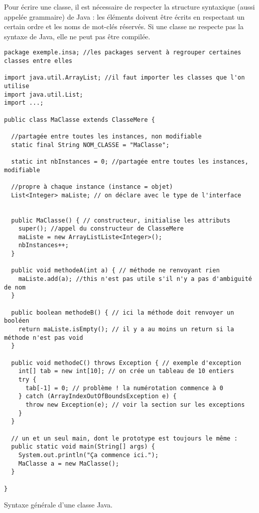 \documentclass[10pt]{article}
\begin{document}
Pour écrire une classe, il est nécessaire de respecter la structure syntaxique (aussi appelée grammaire)
de Java : les éléments doivent être écrits en respectant un certain ordre et les noms
de mot-clés réservés. Si une classe ne respecte pas la syntaxe de Java, elle ne peut pas être compilée.


\begin{listing}[h!]
\begin{verbatim}
package exemple.insa; //les packages servent à regrouper certaines classes entre elles

import java.util.ArrayList; //il faut importer les classes que l'on utilise
import java.util.List;
import ...;

public class MaClasse extends ClasseMere {

  //partagée entre toutes les instances, non modifiable
  static final String NOM_CLASSE = "MaClasse"; 

  static int nbInstances = 0; //partagée entre toutes les instances, modifiable

  //propre à chaque instance (instance = objet) 
  List<Integer> maListe; // on déclare avec le type de l'interface


  public MaClasse() { // constructeur, initialise les attributs
    super(); //appel du constructeur de ClasseMere
    maListe = new ArrayListListe<Integer>();
    nbInstances++;
  }

  public void methodeA(int a) { // méthode ne renvoyant rien
    maListe.add(a); //this n'est pas utile s'il n'y a pas d'ambiguité de nom
  }

  public boolean methodeB() { // ici la méthode doit renvoyer un booléen
    return maListe.isEmpty(); // il y a au moins un return si la méthode n'est pas void
  }

  public void methodeC() throws Exception { // exemple d'exception
    int[] tab = new int[10]; // on crée un tableau de 10 entiers
    try {
      tab[-1] = 0; // problème ! la numérotation commence à 0
    } catch (ArrayIndexOutOfBoundsException e) {
      throw new Exception(e); // voir la section sur les exceptions
    }
  }

  // un et un seul main, dont le prototype est toujours le même :
  public static void main(String[] args) {
    System.out.println("Ça commence ici.");
    MaClasse a = new MaClasse();
  }
  
}
\end{verbatim}
\caption{Syntaxe générale d'une classe Java.
\label{lst.syntax}}
\end{listing}
\end{document}
